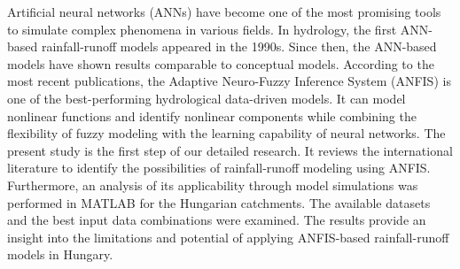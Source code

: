 Artificial neural networks (ANNs) have become one of the most promising tools to simulate complex phenomena in various fields. In hydrology, the first ANN-based rainfall-runoff models appeared in the 1990s. Since then, the ANN-based models have shown results comparable to conceptual models. According to the most recent publications, the Adaptive Neuro-Fuzzy Inference System (ANFIS) is one of the best-performing hydrological data-driven models. It can model nonlinear functions and identify nonlinear components while combining the flexibility of fuzzy modeling with the learning capability of neural networks. The present study is the first step of our detailed research. It reviews the international literature to identify the possibilities of rainfall-runoff modeling using ANFIS. Furthermore, an analysis of its applicability through model simulations was performed in MATLAB for the Hungarian catchments. The available datasets and the best input data combinations were examined. The results provide an insight into the limitations and potential of applying ANFIS-based rainfall-runoff models in Hungary.  



\newpage{}
{}
\begin{flushleft}





\end{flushleft}

\noindent

